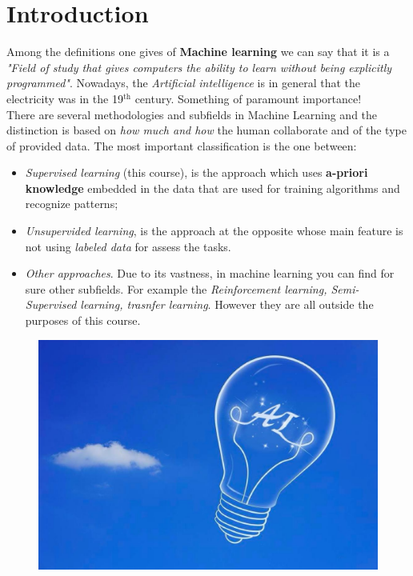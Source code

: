 \chapter{Introduction}
Among the definitions one gives of \textbf{Machine learning} we can say that it is a \textit{"Field of study that gives computers the ability to learn without being explicitly programmed"}. Nowadays, the \textit{Artificial intelligence} is in general that the electricity was in the 19$^\text{th}$ century. Something of paramount importance! \\
There are several methodologies and subfields in Machine Learning and the distinction is based on \textit{how much and how} the human collaborate and of the type of provided data. The most important classification is the one between:
\begin{itemize}
    \itemsep-0.3em
    \item \textit{Supervised learning} (this course), is the approach which uses \textbf{a-priori knowledge} embedded in the data that are used for training algorithms and recognize patterns;
    \item \textit{Unsupervided learning}, is the approach at the opposite whose main feature is not using \textit{labeled data} for assess the tasks.
    \item \textit{Other approaches}. Due to its vastness, in machine learning you can find for sure other subfields. For example the \textit{Reinforcement learning, Semi-Supervised learning, trasnfer learning}. However they are all outside the purposes of this course. 
\end{itemize}

\begin{figure}[h]
    \centering
    \includegraphics[scale=0.2]{img/AI.jpeg}
\end{figure}

